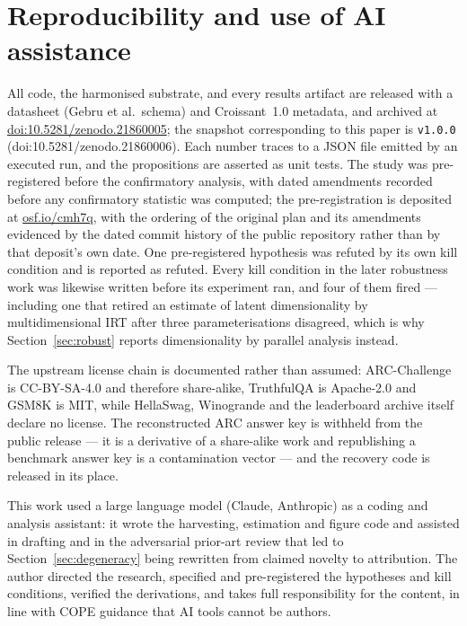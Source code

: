\documentclass[pdflatex,sn-mathphys-ay]{sn-jnl}
\theoremstyle{thmstyleone}
\theoremstyle{thmstylethree}
\begin{document}
\section{Reproducibility and use of AI assistance}

All code, the harmonised substrate, and every results artifact are released with a datasheet
(Gebru et al.\ schema) and Croissant~1.0 metadata, and archived at
\href{https://doi.org/10.5281/zenodo.21860005}{doi:10.5281/\allowbreak zenodo.21860005}; the
snapshot corresponding to this paper is \texttt{v1.0.0}
(doi:10.5281/\allowbreak zenodo.21860006). Each number traces to a JSON file emitted by an
executed run, and the propositions are asserted as unit tests. The study was pre-registered before
the confirmatory analysis, with dated amendments recorded before any confirmatory statistic was
computed; the pre-registration is deposited at \href{https://osf.io/cmh7q/}{osf.io/cmh7q}, with the
ordering of the original plan and its amendments evidenced by the dated commit history of the
public repository rather than by that deposit's own date. One pre-registered hypothesis was refuted
by its own kill condition and is reported as refuted. Every kill condition in the later robustness work was likewise written before its
experiment ran, and four of them fired --- including one that retired an estimate of latent
dimensionality by multidimensional IRT after three parameterisations disagreed, which is why
Section~\ref{sec:robust} reports dimensionality by parallel analysis instead.

The upstream license chain is documented rather than assumed: ARC-Challenge is CC-BY-SA-4.0 and
therefore share-alike, TruthfulQA is Apache-2.0 and GSM8K is MIT, while HellaSwag, Winogrande and
the leaderboard archive itself declare no license. The reconstructed ARC answer key is withheld
from the public release --- it is a derivative of a share-alike work and republishing a benchmark
answer key is a contamination vector --- and the recovery code is released in its place.

This work used a large language model (Claude, Anthropic) as a coding and analysis assistant: it
wrote the harvesting, estimation and figure code and assisted in drafting and in the adversarial
prior-art review that led to Section~\ref{sec:degeneracy} being rewritten from claimed novelty to
attribution. The author directed the research, specified and pre-registered the hypotheses and
kill conditions, verified the derivations, and takes full responsibility for the content, in line
with COPE guidance that AI tools cannot be authors.
\end{document}
